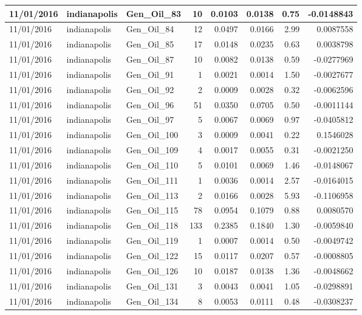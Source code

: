\documentclass[
  letterpaper,
  DIV=11,
  numbers=noendperiod]{scrartcl}
\begin{document}
\begin{tabular}{l|l|l|r|r|r|r|r}
\hline
11/01/2016 & indianapolis & Gen\_Oil\_83 & 10 & 0.0103 & 0.0138 & 0.75 & -0.0148843\\
\hline
11/01/2016 & indianapolis & Gen\_Oil\_84 & 12 & 0.0497 & 0.0166 & 2.99 & 0.0087558\\
\hline
11/01/2016 & indianapolis & Gen\_Oil\_85 & 17 & 0.0148 & 0.0235 & 0.63 & 0.0038798\\
\hline
11/01/2016 & indianapolis & Gen\_Oil\_87 & 10 & 0.0082 & 0.0138 & 0.59 & -0.0277969\\
\hline
11/01/2016 & indianapolis & Gen\_Oil\_91 & 1 & 0.0021 & 0.0014 & 1.50 & -0.0027677\\
\hline
11/01/2016 & indianapolis & Gen\_Oil\_92 & 2 & 0.0009 & 0.0028 & 0.32 & -0.0062596\\
\hline
11/01/2016 & indianapolis & Gen\_Oil\_96 & 51 & 0.0350 & 0.0705 & 0.50 & -0.0011144\\
\hline
11/01/2016 & indianapolis & Gen\_Oil\_97 & 5 & 0.0067 & 0.0069 & 0.97 & -0.0405812\\
\hline
11/01/2016 & indianapolis & Gen\_Oil\_100 & 3 & 0.0009 & 0.0041 & 0.22 & 0.1546028\\
\hline
11/01/2016 & indianapolis & Gen\_Oil\_109 & 4 & 0.0017 & 0.0055 & 0.31 & -0.0021250\\
\hline
11/01/2016 & indianapolis & Gen\_Oil\_110 & 5 & 0.0101 & 0.0069 & 1.46 & -0.0148067\\
\hline
11/01/2016 & indianapolis & Gen\_Oil\_111 & 1 & 0.0036 & 0.0014 & 2.57 & -0.0164015\\
\hline
11/01/2016 & indianapolis & Gen\_Oil\_113 & 2 & 0.0166 & 0.0028 & 5.93 & -0.1106958\\
\hline
11/01/2016 & indianapolis & Gen\_Oil\_115 & 78 & 0.0954 & 0.1079 & 0.88 & 0.0080570\\
\hline
11/01/2016 & indianapolis & Gen\_Oil\_118 & 133 & 0.2385 & 0.1840 & 1.30 & -0.0059840\\
\hline
11/01/2016 & indianapolis & Gen\_Oil\_119 & 1 & 0.0007 & 0.0014 & 0.50 & -0.0049742\\
\hline
11/01/2016 & indianapolis & Gen\_Oil\_122 & 15 & 0.0117 & 0.0207 & 0.57 & -0.0008805\\
\hline
11/01/2016 & indianapolis & Gen\_Oil\_126 & 10 & 0.0187 & 0.0138 & 1.36 & -0.0048662\\
\hline
11/01/2016 & indianapolis & Gen\_Oil\_131 & 3 & 0.0043 & 0.0041 & 1.05 & -0.0298891\\
\hline
11/01/2016 & indianapolis & Gen\_Oil\_134 & 8 & 0.0053 & 0.0111 & 0.48 & -0.0308237\\

\end{tabular}
\end{document}
